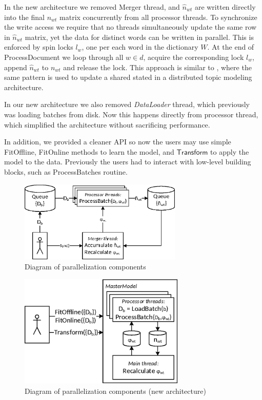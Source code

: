 \documentclass[russian,english]{llncs}
\newcommand{\kw}[1]{\textsf{#1}}
\begin{document}
In the new architecture we removed Merger thread, and $\hat n_{wt}$ are written directly into the final $n_{wt}$ matrix
concurrently from all processor threads.
To synchronize the write access we require that
no threads simultaneously update the same row in $\hat n_{wt}$ matrix,
yet the data for distinct words can be written in parallel.
This is enforced by spin locks $l_w$, one per each word in the dictionary $W$.
At the end of \kw{ProcessDocument} we loop through all $w \in d$, acquire the corresponding lock $l_w$, append $\hat n_{wt}$ to $n_{wt}$ and release the lock.
This approach is similar to \cite{smola10architecture},
where the same pattern is used to update a shared stated in a distributed topic modeling architecture.

In our new architecture we also removed \emph{DataLoader} thread, which previously was loading batches from disk.
Now this happens directly from processor thread, which simplified the architecture without sacrificing performance.

In addition, we provided a cleaner API so now the users may use simple \kw{FitOffline}, \kw{FitOnline} methods to learn the model,
and $\kw{Transform}$ to apply the model to the data.
Previously the users had to interact with low-level building blocks, such as \kw{ProcessBatches} routine.

\begin{figure}[t]
\begin{centering}
\includegraphics[height=39mm]{diagramm_artm_core.eps}
\caption{Diagram of parallelization components}
\label{fig:diagramm_artm_core}
\end{centering}
\end{figure}

\begin{figure}[t]
\begin{centering}
\includegraphics[height=54mm]{diagramm_artm_core_v07.eps}
\caption{Diagram of parallelization components (new architecture)}
\label{fig:diagramm_artm_core_v07}
\end{centering}
\end{figure}
\end{document}
